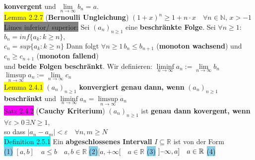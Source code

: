 \documentclass[10pt]{article}
\begin{document}
        \indent \textbf{konvergent} und 
                \textcolor{NavyBlue}{$\lim\limits_{n\to\infty}b_n=a$}.\\
\colorbox{yellow}{Lemma 2.2.7} (\textbf{Bernoulli Ungleichung}) 
                \textcolor{NavyBlue}{
                $(1+x)^n\geqslant 1+n\cdot x \quad\forall n\in\mathbb{N},\, x>-1$}\\
\colorbox{gray}{Limes inferior/ superior:} Sei \textcolor{NavyBlue}{$(a_n)_{n\geqslant 1}$}
                eine \textbf{beschränkte Folge}. Sei 
                \textcolor{NavyBlue}{$\forall n\geqslant1$: $b_n=inf\{a_k:k\geqslant n\},$\\
        \indent $c_n=sup\{a_k:k\geqslant n\}$} Dann folgt 
                \textcolor{NavyBlue}{$\forall n\geqslant1\,b_n\leqslant b_{n+1}$} 
                (\textbf{monoton wachsend}) und 
                \textcolor{NavyBlue}{$c_n\geqslant c_{n+1}$} (\textbf{monoton fallend}) \\
        \indent und \textbf{beide Folgen beschränkt}. Wir definieren: 
                \textcolor{NavyBlue}{
                $\liminf\limits_{n\to\infty}a_n:=\lim\limits_{n\to\infty}b_n$ \qquad
                $\limsup\limits_{n\to\infty}a_n:=\lim\limits_{n\to\infty}c_n$}\\
\colorbox{yellow}{Lemma 2.4.1} $(a_n)_{n\geqslant1}$ \textbf{konvergiert genau dann, wenn} 
                \textcolor{NavyBlue}{$(a_n)_{n\geqslant1}$} \textbf{beschränkt} und 
                \textcolor{NavyBlue}{
                $\liminf\limits_{n\to\infty}a_n=\limsup\limits_{n\to\infty}a_n$}\\
\colorbox{magenta}{Satz 2.4.2} (\textbf{Cauchy Kriterium}) $(a_n)_{n\geqslant1}$ ist
                \textbf{genau dann kovergent, wenn} 
                \textcolor{NavyBlue}{$\forall\varepsilon >0\,\exists N\geqslant1$}, \\
        \indent so dass 
                \textcolor{NavyBlue}{$|a_n-a_m|<\varepsilon\quad\forall n,m\geqslant N$}\\
\colorbox{cyan}{Definition 2.5.1} Ein \textbf{abgeschlossenes Intervall} 
                $I\subseteq\mathbb{R}$ ist von der Form\\
        \indent\colorbox{SkyBlue}{(1)} 
                $[a,b]\quad a\leqslant b\quad a,b\in\mathbb{R}$\quad\enspace 
                \colorbox{SkyBlue}{(2)}$[a,+\infty[\quad a\in\mathbb{R}$\quad\enspace
                \colorbox{SkyBlue}{(3)}
                $]\scalebox{0.75}[1.0]{\(-\)}\infty,a]\quad a\in\mathbb{R}$\quad\enspace
                \colorbox{SkyBlue}{(4)} 
\end{document}
